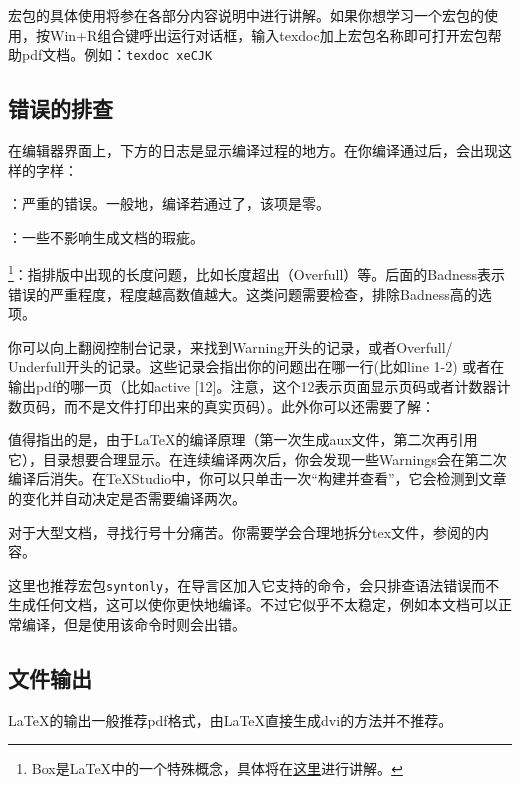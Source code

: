 {宏包的具体使用将参在各部分内容说明中进行讲解。如果你想学习一个宏包的使用，按Win+R组合键呼出运行对话框，输入texdoc加上宏包名称即可打开宏包帮助pdf文档。例如：\verb|texdoc xeCJK|

\subsection{错误的排查}
\label{subsec:debug}
在编辑器界面上，下方的日志是显示编译过程的地方。在你编译通过后，会出现这样的字样：
\begin{feai}
	\item {}：严重的错误。一般地，编译若通过了，该项是零。
	\item {}：一些不影响生成文档的瑕疵。
	\item {\footnote{Box是\LaTeX{}中的一个特殊概念，具体将在\hyperref[sec:box]{这里}进行讲解。}}：指排版中出现的长度问题，比如长度超出（Overfull）等。后面的Badness表示错误的严重程度，程度越高数值越大。这类问题需要检查，排除Badness高的选项。
\end{feai}

你可以向上翻阅控制台记录，来找到Warning开头的记录，或者Overfull/ Underfull开头的记录。这些记录会指出你的问题出在哪一行(比如line 1-2) 或者在输出pdf的哪一页（比如active [12]。注意，这个12表示页面显示页码或者计数器计数页码，而不是文件打印出来的真实页码）。此外你可以还需要了解：
\begin{feai}
	\item 值得指出的是，由于\LaTeX{}的编译原理（第一次生成aux文件，第二次再引用它），目录想要合理显示。在连续编译两次后，你会发现一些Warnings会在第二次编译后消失。在\TeX Studio中，你可以只单击一次“构建并查看”，它会检测到文章的变化并自动决定是否需要编译两次。
	\item 对于大型文档，寻找行号十分痛苦。你需要学会合理地拆分tex文件，参阅的内容。
\end{feai}

这里也推荐宏包\texttt{syntonly}，在导言区加入它支持的\latexline{\\syntaxonly}命令，会只排查语法错误而不生成任何文档，这可以使你更快地编译。不过它似乎不太稳定，例如本文档可以正常编译，但是使用该命令时则会出错。

\subsection{文件输出}
\LaTeX{}的输出一般推荐pdf格式，由\LaTeX 直接生成dvi的方法并不推荐。

}
